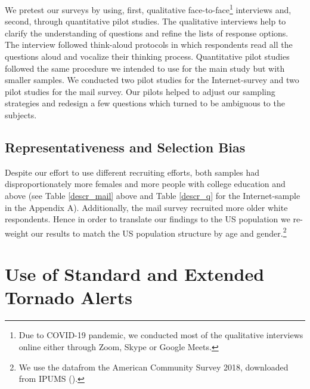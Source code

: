 \documentclass{ametsocV6.1}
\begin{document}
We pretest our surveys by using, first, qualitative face-to-face\footnote{Due to COVID-19 pandemic, we conducted most of the qualitative interviews online either through Zoom, Skype or Google Meets.} interviews and, second, through quantitative pilot studies. The qualitative interviews help to clarify the understanding of questions and refine the lists of response options. The interview followed think-aloud protocols \citep{dillman_internet_2008} in which respondents  read all the questions aloud and vocalize their thinking process. Quantitative pilot studies followed the same procedure we intended to use for the main study but with smaller samples. We conducted two pilot studies for the Internet-survey and two pilot studies for the mail survey. Our pilots helped to adjust our sampling strategies and redesign a few questions which turned to be ambiguous to the subjects.

\vspace{10pt}
\subsection{Representativeness and Selection Bias} 
Despite our effort to use different recruiting efforts, both samples had disproportionately more females and more people with college education and above (see Table \ref{descr_mail} above and Table \ref{descr_q} for the Internet-sample in the Appendix A). Additionally, the mail survey recruited more older white respondents. Hence in order to translate our findings to the US population we re-weight our results to match the US population structure by age and gender.\footnote{We use the datafrom the American Community Survey 2018, downloaded from IPUMS (\citet{ruggles_ipums_2021}).}



\vspace{20pt}
\section{Use of Standard and Extended Tornado Alerts}
\end{document}
